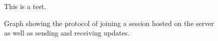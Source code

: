 \begin{figure}[h]

    This is a test.

  \caption{Graph showing the protocol of joining a session hosted on the server as well as sending and receiving updates.}
  \label{fig:client-protocol}
\end{figure}
